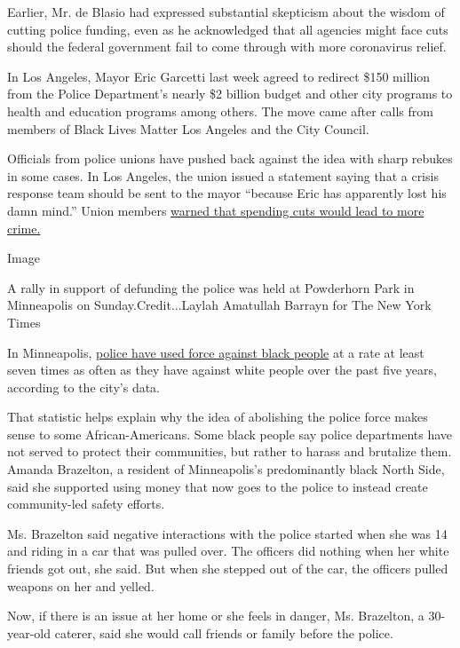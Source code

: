 Earlier, Mr. de Blasio had expressed substantial skepticism about the
wisdom of cutting police funding, even as he acknowledged that all
agencies might face cuts should the federal government fail to come
through with more coronavirus relief.

In Los Angeles, Mayor Eric Garcetti last week agreed to redirect \$150
million from the Police Department's nearly \$2 billion budget and other
city programs to health and education programs among others. The move
came after calls from members of Black Lives Matter Los Angeles and the
City Council.

Officials from police unions have pushed back against the idea with
sharp rebukes in some cases. In Los Angeles, the union issued a
statement saying that a crisis response team should be sent to the mayor
``because Eric has apparently lost his damn mind.'' Union members
\href{https://abc7.com/mayor-eric-garcetti-lapd-george-floyd-police-misconduct/6234091/}{warned
that spending cuts would lead to more crime.}

Image

A rally in support of defunding the police was held at Powderhorn Park
in Minneapolis on Sunday.Credit...Laylah Amatullah Barrayn for The New
York Times

In Minneapolis,
\href{https://www.nytimes.com/interactive/2020/06/03/us/minneapolis-police-use-of-force.html}{police
have used force against black people} at a rate at least seven times as
often as they have against white people over the past five years,
according to the city's data.

That statistic helps explain why the idea of abolishing the police force
makes sense to some African-Americans. Some black people say police
departments have not served to protect their communities, but rather to
harass and brutalize them. Amanda Brazelton, a resident of Minneapolis's
predominantly black North Side, said she supported using money that now
goes to the police to instead create community-led safety efforts.

Ms. Brazelton said negative interactions with the police started when
she was 14 and riding in a car that was pulled over. The officers did
nothing when her white friends got out, she said. But when she stepped
out of the car, the officers pulled weapons on her and yelled.

Now, if there is an issue at her home or she feels in danger, Ms.
Brazelton, a 30-year-old caterer, said she would call friends or family
before the police.

